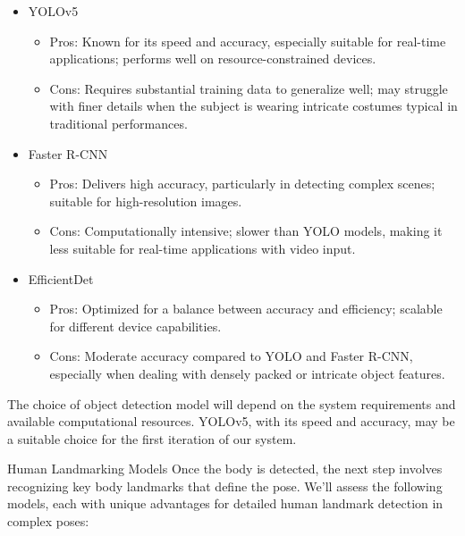 \begin{itemize}
    \item YOLOv5
    \begin{itemize}
            \item Pros: Known for its speed and accuracy, especially suitable for real-time applications; performs well on resource-constrained devices.
    \item Cons: Requires substantial training data to generalize well; may struggle with finer details when the subject is wearing intricate costumes typical in traditional performances.
    \end{itemize}
    \item Faster R-CNN
    \begin{itemize}
            \item Pros: Delivers high accuracy, particularly in detecting complex scenes; suitable for high-resolution images.
    \item Cons: Computationally intensive; slower than YOLO models, making it less suitable for real-time applications with video input.
    \end{itemize} 

    \item EfficientDet
        \begin{itemize}
            
    \item Pros: Optimized for a balance between accuracy and efficiency; scalable for different device capabilities.
    \item Cons: Moderate accuracy compared to YOLO and Faster R-CNN, especially when dealing with densely packed or intricate object features.
        \end{itemize}
\end{itemize}
The choice of object detection model will depend on the system requirements and available computational resources. YOLOv5, with its speed and accuracy, may be a suitable choice for the first iteration of our system.

Human Landmarking Models
Once the body is detected, the next step involves recognizing key body landmarks that define the pose. We’ll assess the following models, each with unique advantages for detailed human landmark detection in complex poses:

